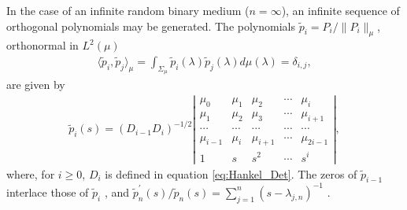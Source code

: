 \documentclass[english,12pt]{ttuthes}
\begin{document}
In the case of an infinite random binary medium ($n=\infty$), an infinite
sequence of orthogonal polynomials may be generated. The polynomials
$\tilde{p}_i=P_i/\|P_i\|_\mu$, orthonormal in $L^2(\mu)$ 
%
\begin{align}\label{eq:Orthonormal_P_mu}
  \langle \tilde{p}_i,\tilde{p}_j\rangle_\mu=\int_{\Sigma_\mu}\tilde{p}_i(\lambda)\tilde{p}_j(\lambda)d\mu(\lambda)=\delta_{i,j},
\end{align}
%
are given by \cite{Deift:2000:RMT,Szego:39} 
%
\begin{align}\label{eq:OP_mu_mom_def}
  \tilde{p}_i(s)=(D_{i-1}D_i)^{-1/2}
  \left|
    \begin{matrix}
      \mu_0   & \mu_1 & \mu_2   & \cdots & \mu_i  \\
      \mu_1   & \mu_2 & \mu_3   & \cdots & \mu_{i+1}\\
      \cdots     & \cdots   & \cdots     & \cdots & \cdots    \\
      \mu_{i-1} & \mu_i & \mu_{i+1} & \cdots & \mu_{2i-1}\\
      1     & s    & s^2    & \cdots & s^i
    \end{matrix}
  \right|,  
\end{align}
%
where, for $i\geq0$, $D_i$ is defined in equation
\eqref{eq:Hankel_Det}. The zeros of $\tilde{p}_{i-1}$ interlace those
of $\tilde{p}_i$ \cite{Ismail:2005}, and
$\tilde{p}_n^\prime(s)/\tilde{p}_n(s)=\sum_{j=1}^n(s-\lambda_{j,n})^{-1}$
\cite{Assche:JCAM:1991:237}.
\end{document}
